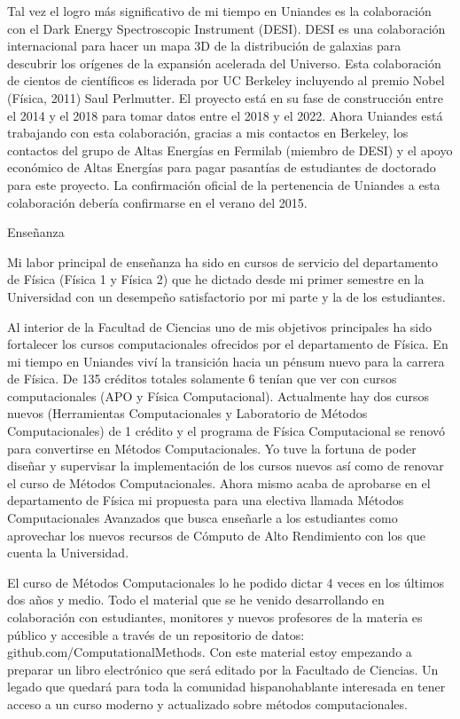 Tal vez el logro más significativo de mi tiempo en Uniandes es la
colaboración con el Dark Energy Spectroscopic Instrument (DESI). DESI
es una colaboración internacional para hacer un mapa 3D de la
distribución de galaxias para descubrir los orígenes de la expansión
acelerada del Universo. Esta colaboración de cientos de científicos es
liderada por UC Berkeley incluyendo al premio Nobel (Física, 2011)
Saul Perlmutter. El proyecto está en su fase de construcción entre el
2014 y el 2018 para tomar datos entre el 2018 y el 2022. Ahora
Uniandes está trabajando con esta colaboración, gracias a mis
contactos en Berkeley, los contactos del grupo de Altas Energías en
Fermilab (miembro de DESI) y el apoyo económico de Altas Energías para
pagar pasantías de estudiantes de doctorado para este proyecto. La
confirmación oficial de la pertenencia de Uniandes a esta colaboración
debería confirmarse en el verano del 2015. 



Enseñanza


Mi labor principal de enseñanza ha sido en cursos de servicio del
departamento de Física (Física 1 y Física 2) que he dictado desde mi
primer semestre en la Universidad con un desempeño satisfactorio por
mi parte y la de los estudiantes.

Al interior de la Facultad de Ciencias uno de mis objetivos
principales ha sido fortalecer los cursos computacionales ofrecidos por
el departamento de Física. En mi tiempo en Uniandes viví la transición
hacia un pénsum nuevo para la carrera de Física. De 135 créditos
totales solamente 6 tenían que ver con cursos computacionales (APO y
Física Computacional). Actualmente hay dos cursos nuevos (Herramientas
Computacionales y Laboratorio de Métodos Computacionales) de 1 crédito
y el programa de Física Computacional se renovó para convertirse en
Métodos Computacionales. Yo tuve la fortuna de poder diseñar y
supervisar la implementación de los cursos nuevos así como de renovar
el curso de Métodos  Computacionales. Ahora mismo acaba de aprobarse
en el departamento de Física mi propuesta para una electiva llamada
Métodos Computacionales Avanzados que busca enseñarle a los
estudiantes como aprovechar los nuevos  recursos de Cómputo de Alto
Rendimiento con los que cuenta la Universidad.


El curso de Métodos Computacionales lo he podido dictar 4 veces en los
últimos dos años y medio. Todo el material que se he venido
desarrollando en colaboración con estudiantes, monitores y nuevos
profesores de la materia es público y accesible a través de un
repositorio de datos: github.com/ComputationalMethods.
Con este material estoy empezando a preparar un libro electrónico que
será editado por la Facultado de Ciencias. Un legado que quedará para
toda la comunidad hispanohablante interesada en tener acceso a un
curso moderno y actualizado sobre métodos computacionales.


